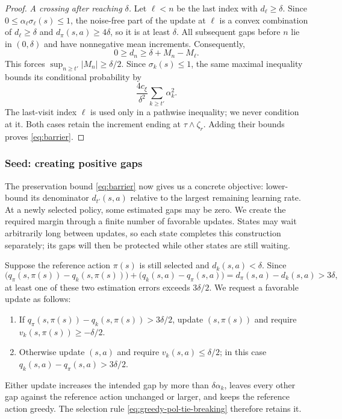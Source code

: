 \begin{proof}
\emph{A crossing after reaching $\delta$.} Let $\ell<n$ be the last index with $d_\ell\ge\delta$. Since $0\le\alpha_\ell\sigma_\ell(s)\le1$, the noise-free part of the update at $\ell$ is a convex combination of $d_\ell\ge\delta$ and $d_\pi(s,a)\ge4\delta$, so it is at least $\delta$. All subsequent gaps before $n$ lie in $(0,\delta)$ and have nonnegative mean increments. Consequently,
\[
0\ge d_n\ge\delta+M_n-M_\ell.
\]
This forces $\sup_{n\ge t'}|M_n|\ge\delta/2$. Since $\sigma_k(s)\le1$, the same maximal inequality bounds its conditional probability by
\[
\frac{4c_\xi}{\delta^2}\sum_{k\ge t'}\alpha_k^2.
\]
The last-visit index $\ell$ is used only in a pathwise inequality; we never condition at it. Both cases retain the increment ending at $\tau\wedge\zeta_r$. Adding their bounds proves \eqref{eq:barrier}.
\end{proof}

\subsubsection{Seed: creating positive gaps}
The preservation bound \eqref{eq:barrier} now gives us a concrete objective: lower-bound its denominator $d_{t'}(s,a)$ relative to the largest remaining learning rate. At a newly selected policy, some estimated gaps may be zero. We create the required margin through a finite number of favorable updates. States may wait arbitrarily long between updates, so each state completes this construction separately; its gaps will then be protected while other states are still waiting.

Suppose the reference action $\pi(s)$ is still selected and $d_k(s,a)<\delta$. Since
\[
\big(q_\pi(s,\pi(s))-q_k(s,\pi(s))\big)
+\big(q_k(s,a)-q_\pi(s,a)\big)
=d_\pi(s,a)-d_k(s,a)>3\delta,
\]
at least one of these two estimation errors exceeds $3\delta/2$. We request a favorable update as follows:
\begin{enumerate}
\item If $q_\pi(s,\pi(s))-q_k(s,\pi(s))>3\delta/2$, update $(s,\pi(s))$ and require $v_k(s,\pi(s))\ge-\delta/2$.
\item Otherwise update $(s,a)$ and require $v_k(s,a)\le\delta/2$; in this case $q_k(s,a)-q_\pi(s,a)>3\delta/2$.
\end{enumerate}
Either update increases the intended gap by more than $\delta\alpha_k$, leaves every other gap against the reference action unchanged or larger, and keeps the reference action greedy. The selection rule \eqref{eq:greedy-pol-tie-breaking} therefore retains it.

